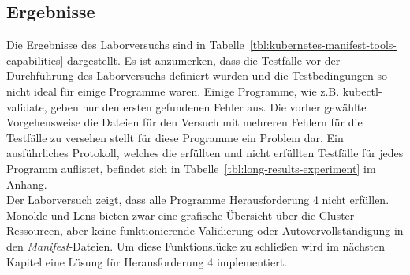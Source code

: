 \subsection{Ergebnisse}

Die Ergebnisse des Laborversuchs sind in Tabelle~\ref{tbl:kubernetes-manifest-tools-capabilities} dargestellt.
Es ist anzumerken, dass die Testfälle vor der Durchführung des Laborversuchs definiert wurden und die Testbedingungen so nicht
ideal für einige Programme waren. Einige Programme, wie z.B. kubectl-validate, geben nur den ersten gefundenen Fehler aus.
Die vorher gewählte Vorgehensweise die Dateien für den Versuch mit mehreren Fehlern für die Testfälle zu versehen stellt für
diese Programme ein Problem dar. Ein ausführliches Protokoll, welches die erfüllten und nicht erfüllten Testfälle für jedes Programm
auflistet, befindet sich in Tabelle~\ref{tbl:long-results-experiment} im Anhang. \\
Der Laborversuch zeigt, dass alle Programme Herausforderung 4 nicht erfüllen.
Monokle und Lens bieten zwar eine grafische Übersicht über die Cluster-Ressourcen, aber keine funktionierende
Validierung oder Autovervollständigung in den \textit{Manifest}-Dateien. Um diese Funktionslücke zu schließen wird im
nächsten Kapitel eine Lösung für Herausforderung 4 implementiert.

